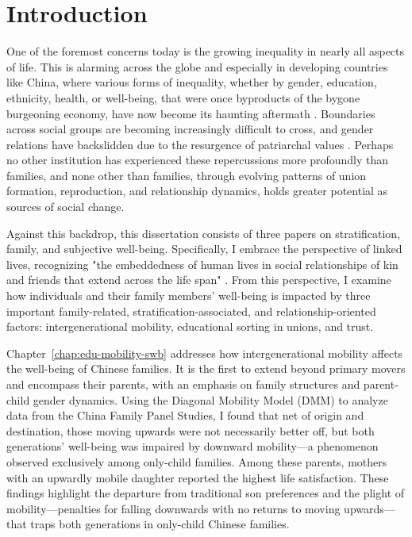 \chapter{Introduction}
\label{chap:introduction}

One of the foremost concerns today is the growing inequality in nearly all aspects of life. This is alarming across the globe and especially in developing countries like China, where various forms of inequality, whether by gender, education, ethnicity, health, or well-being, that were once byproducts of the bygone burgeoning economy, have now become its haunting aftermath \parencite{sicularUrbanRuralIncomeGap2007,xieIncomeInequalityTodays2014,yeungHigherEducationExpansion2013}. Boundaries across social groups are becoming increasingly difficult to cross, and gender relations have backslidden due to the resurgence of patriarchal values \parencite{jiUnequalCareUnequal2017}. Perhaps no other institution has experienced these repercussions more profoundly than families, and none other than families, through evolving patterns of union formation, reproduction, and relationship dynamics, holds greater potential as sources of social change.

Against this backdrop, this dissertation consists of three papers on stratification, family, and subjective well-being. Specifically, I embrace the perspective of linked lives, recognizing "the embeddedness of human lives in social relationships of kin and friends that extend across the life span" \parencite[859]{macmillanFamiliesLifeCourse2005}. From this perspective, I examine how individuals and their family members' well-being is impacted by three important family-related, stratification-associated, and relationship-oriented factors: intergenerational mobility, educational sorting in unions, and trust.

Chapter~\ref{chap:edu-mobility-swb} addresses how intergenerational mobility affects the well-being of Chinese families. It is the first to extend beyond primary movers and encompass their parents, with an emphasis on family structures and parent-child gender dynamics. Using the Diagonal Mobility Model (DMM) to analyze data from the China Family Panel Studies, I found that net of origin and destination, those moving upwards were not necessarily better off, but both generations' well-being was impaired by downward mobility—a phenomenon observed exclusively among only-child families. Among these parents, mothers with an upwardly mobile daughter reported the highest life satisfaction. These findings highlight the departure from traditional son preferences and the plight of mobility—penalties for falling downwards with no returns to moving upwards—that traps both generations in only-child Chinese families.

